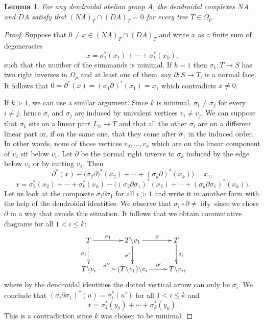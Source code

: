 \documentclass[a4paper]{amsart}
\theoremstyle{plain}
\newtheorem{lem}[thm]{Lemma}
\theoremstyle{definition}
\theoremstyle{remark}
\DeclareMathOperator{\id}{id}
\newcommand{\rpd}{\Omega_p}
\newcommand{\To}{\longrightarrow}
\numberwithin{equation}{section}
\numberwithin{figure}{section}
\begin{document}
\begin{lem}\label{direct sum 1}
For any dendroidal abelian group $A$, the dendroidal complexes $NA$ and $DA$ satisfy that $(NA)_T\cap (DA)_T={0}$ for every tree $T\in\rpd$.
\end{lem}
\begin{proof}
Suppose that $0\neq x\in (NA)_T\cap(DA)_T$ and write $x$ as a finite sum of degeneracies
\[
x=\sigma_1^*(x_1)+\cdots+\sigma_k^*(x_k),
\]
such that the number of the summands is minimal. If $k=1$ then $\sigma_1\colon T\To S$ has two right inverses in $\rpd$ and at
least one of them, say $\partial\colon S\To T$, is a normal face. It follows that $0=\partial^*(x)=(\sigma_1\partial)^*(x_1)=x_1$
which contradicts $x\neq 0$.

If $k>1$, we can use a similar argument.  Since $k$ is minimal, $\sigma_i\neq \sigma_j$ for every $i\ne j$, hence $\sigma_i$ and $\sigma_j$ are induced by univalent vertices
$v_i\neq v_j$. We can suppose that $\sigma_1$ sits on a linear part $L_n\To T$ and that all the other $\sigma_i$ are on a different linear part or, if on the same one, that they come after $\sigma_1$ in the induced order. In other words, none of those vertices $v_2,\ldots,v_k$ which are on the linear component of $v_1$ sit below $v_1$. Let $\partial$ be the normal right inverse to $\sigma_k$ induced by the edge below $v_1$ or by cutting $v_1$. Then
\[
\partial^*(x)-\big(\sigma_2\partial)^*(x_2)+\cdots+(\sigma_{k}\partial)^*(x_{k})\big)=x_1,
\]
\[
x=\sigma^*_2(x_2)+\cdots+\sigma^*_{k}(x_{k})-\big((\sigma_2\partial\sigma_1)^*(x_2)+\cdots+(\sigma_{k}
\partial\sigma_1)^*(x_{k})\big).
\]
Let us look at the composite $\sigma_i\partial\sigma_1$ for all $i>1$ and write it in another form with the help of the dendroidal identities. We observe that $\sigma_i\circ\partial\ne \id_T$ since we chose $\partial$ in a way that avoids this situation.
It follows that we obtain commutative diagrams for all $1<i\le k$:
\[
\xymatrix{T\ar[r]^-{\sigma_1}\ar@{.>}[d]_-{\sigma_i}& T\backslash v_1\ar[r]^-\partial\ar[d]_{\sigma'} &T\ar[d]^{\sigma_i}\\
T\backslash v_i\ar@{.>}[r]^-{\sigma''} &(T\backslash v_1)\backslash v_i \ar[r]^-{\partial'} &T\backslash v_i{\rlap ,}}
\]
where by the dendroidal identities the dotted vertical arrow can only be $\sigma_i$. We conclude that $(\sigma_i\partial\sigma_1)^*(u)=\sigma_i^*(u')$
for all $1<i\le k$ and
\[
x=\sigma_2^*(y_2)+\cdots+\sigma_{k}^*(y_{k}).
\]
This is a contradiction since $k$ was chosen to be minimal.
\end{proof}
\end{document}
